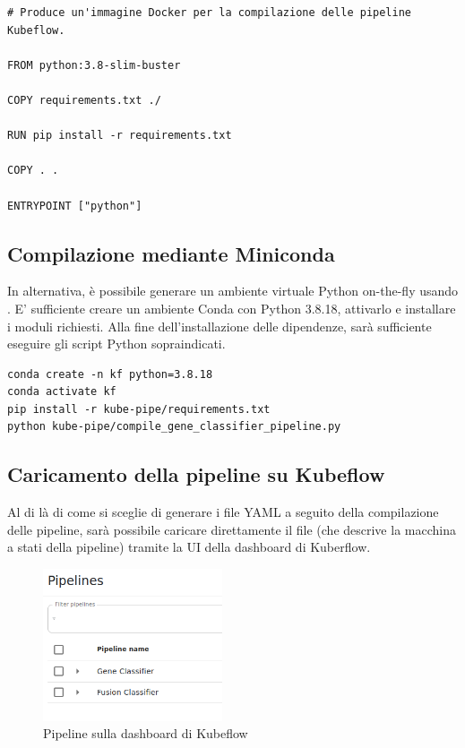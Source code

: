\begin{code}
\label{code:apx:a:dockerfile}
\begin{verbatim}
# Produce un'immagine Docker per la compilazione delle pipeline Kubeflow.

FROM python:3.8-slim-buster

COPY requirements.txt ./

RUN pip install -r requirements.txt

COPY . .

ENTRYPOINT ["python"]
\end{verbatim}
\end{code}

\subsection{Compilazione mediante Miniconda}

In alternativa, è possibile generare un ambiente virtuale Python on-the-fly usando . E' sufficiente creare un ambiente Conda con Python 3.8.18, attivarlo e installare i moduli richiesti. Alla fine dell'installazione delle dipendenze, sarà sufficiente eseguire gli script Python sopraindicati.

\begin{small}
\begin{Verbatim}[commandchars=\\\{\}]
conda create -n kf python=3.8.18
conda activate kf
pip install -r kube-pipe/requirements.txt
python kube-pipe/compile_gene_classifier_pipeline.py
\end{Verbatim}
\end{small}

\subsection{Caricamento della pipeline su Kubeflow}

Al di là di come si sceglie di generare i file YAML a seguito della compilazione delle pipeline, sarà possibile caricare direttamente il file (che descrive la macchina a stati della pipeline) tramite la UI della dashboard di Kuberflow.

\begin{figure}[H]
    \centering
    \includegraphics[width=200px]{figures/ch4and5/pp.png}
    \caption[Pipeline sulla dashboard di Kubeflow]{Pipeline sulla dashboard di Kubeflow}
    \label{fig:cha6:pp-ui}
\end{figure}

